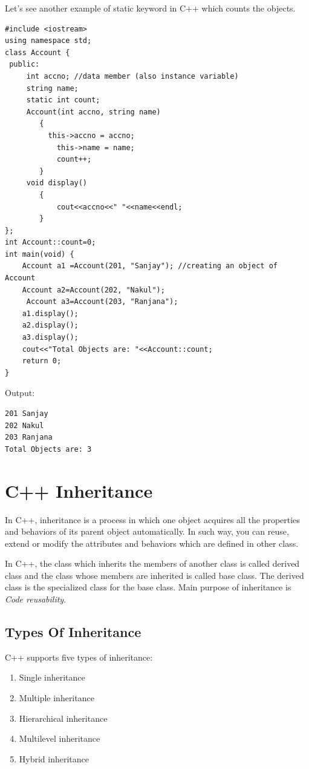 \documentclass{book}
\begin{document}
Let's see another example of static keyword in C++ which counts the objects.

\begin{lstlisting}
#include <iostream>  
using namespace std;  
class Account {  
 public:  
	 int accno; //data member (also instance variable)      
	 string name;   
	 static int count;     
	 Account(int accno, string name)   
		{    
		  this->accno = accno;    
			this->name = name;    
			count++;  
		}    
	 void display()    
		{    
			cout<<accno<<" "<<name<<endl;   
		}    
};  
int Account::count=0;  
int main(void) {  
	Account a1 =Account(201, "Sanjay"); //creating an object of Account  
	Account a2=Account(202, "Nakul");   
	 Account a3=Account(203, "Ranjana");  
	a1.display();    
	a2.display();    
	a3.display();    
	cout<<"Total Objects are: "<<Account::count;  
	return 0;  
}  
\end{lstlisting} 

Output:

\begin{verbatim}
201 Sanjay
202 Nakul
203 Ranjana
Total Objects are: 3
\end{verbatim} 

\section{C++ Inheritance}

In C++, inheritance is a process in which one object acquires all the properties and behaviors of its parent object automatically. In such way, you can reuse, extend or modify the attributes and behaviors which are defined in other class.

In C++, the class which inherits the members of another class is called derived class and the class whose members are inherited is called base class. The derived class is the specialized class for the base class. Main purpose of inheritance is \textit{Code reusability}. 

\subsection{Types Of Inheritance}

C++ supports five types of inheritance:

\begin{enumerate}
	\item Single inheritance
\item Multiple inheritance
\item Hierarchical inheritance
\item Multilevel inheritance
\item Hybrid inheritance
\end{enumerate}
\end{document}
